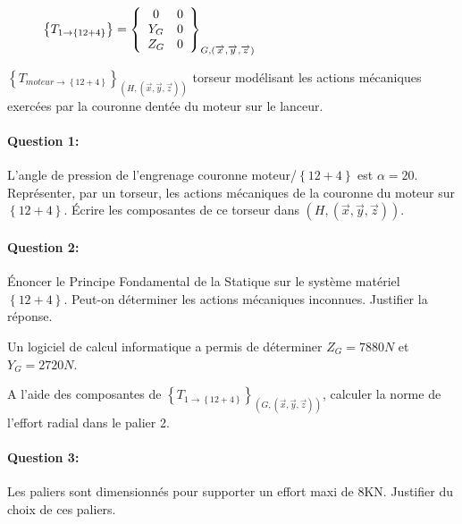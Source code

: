 \begin{figure}[!h]
\begin{math}
  \left\{T_{1 \rightarrow \left\{12+4\right\}}\right\}=\left\{
  \begin{array}{c c}
  0 & 0 \\
  Y_G & 0 \\
  Z_G & 0
  \end{array}\right\}_{G,(\overrightarrow{x},\overrightarrow{y},\overrightarrow{z})}
\end{math}
\end{figure}

$\left\{T_{moteur \rightarrow \left\{12+4\right\}}\right\}_{(H,(\overrightarrow{x},\overrightarrow{y},\overrightarrow{z}))}$ torseur modélisant les actions mécaniques exercées par la couronne dentée du moteur sur le lanceur.

\paragraph{Question 1:} L'angle de pression de l'engrenage couronne moteur/$\left\{12+4\right\}$ est $\alpha=20$\textdegree.
Représenter, par un torseur, les actions mécaniques de la couronne du moteur sur $\left\{12+4\right\}$.
Écrire les composantes de ce torseur dans $(H,(\overrightarrow{x},\overrightarrow{y},\overrightarrow{z}))$.

\paragraph{Question 2:} Énoncer le Principe Fondamental de la Statique sur le système matériel $\left\{12+4\right\}$. Peut-on déterminer les actions mécaniques inconnues. Justifier la réponse.

Un logiciel de calcul informatique a permis de déterminer $Z_G = 7880 N$ et $Y_G = 2720 N$.

A l'aide des composantes de $\left\{T_{1 \rightarrow \left\{12+4\right\}}\right\}_{(G,(\overrightarrow{x},\overrightarrow{y},\overrightarrow{z}))}$, calculer la norme de l'effort radial dans le palier 2.

\paragraph{Question 3:} Les paliers sont dimensionnés pour supporter un effort maxi de 8KN. Justifier du choix de ces paliers.

\newpage



%


